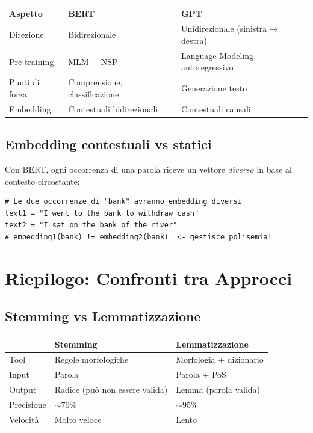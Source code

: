 \documentclass[12pt,a4paper]{article}
\begin{document}
\begin{center}
\begin{tabular}{lll}
\toprule
\textbf{Aspetto} & \textbf{BERT} & \textbf{GPT} \\
\midrule
Direzione & Bidirezionale & Unidirezionale (sinistra$\to$destra) \\
Pre-training & MLM + NSP & Language Modeling autoregressivo \\
Punti di forza & Comprensione, classificazione & Generazione testo \\
Embedding & Contestuali bidirezionali & Contestuali causali \\
\bottomrule
\end{tabular}
\end{center}

\subsection{Embedding contestuali vs statici}

Con BERT, ogni occorrenza di una parola riceve un vettore \emph{diverso} in base al contesto circostante:

\begin{lstlisting}
# Le due occorrenze di "bank" avranno embedding diversi
text1 = "I went to the bank to withdraw cash"
text2 = "I sat on the bank of the river"
# embedding1(bank) != embedding2(bank)  <- gestisce polisemia!
\end{lstlisting}

\section{Riepilogo: Confronti tra Approcci}

\subsection{Stemming vs Lemmatizzazione}

\begin{center}
\begin{tabular}{lll}
\toprule
& \textbf{Stemming} & \textbf{Lemmatizzazione} \\
\midrule
Tool & Regole morfologiche & Morfologia + dizionario \\
Input & Parola & Parola + PoS \\
Output & Radice (può non essere valida) & Lemma (parola valida) \\
Precisione & $\sim$70\% & $\sim$95\% \\
Velocità & Molto veloce & Lento \\
\bottomrule
\end{tabular}
\end{center}
\end{document}
